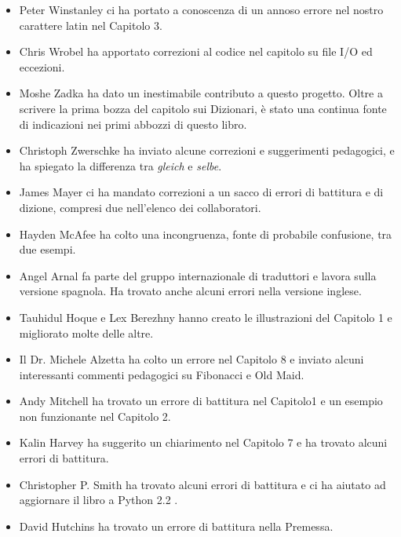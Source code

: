 \documentclass[10pt]{book}
\begin{document}
\begin{itemize}
\item Peter Winstanley ci ha portato a conoscenza di un annoso errore nel nostro carattere latin nel Capitolo 3.

\item Chris Wrobel ha apportato correzioni al codice nel capitolo su file I/O ed eccezioni. 

\item Moshe Zadka ha dato un inestimabile contributo a questo progetto. Oltre a scrivere la prima bozza del capitolo sui Dizionari, è stato una continua fonte di indicazioni nei primi abbozzi di questo libro.

\item Christoph Zwerschke ha inviato alcune correzioni e suggerimenti pedagogici, e ha spiegato la differenza tra {\em gleich} e {\em selbe}.

\item James Mayer ci ha mandato correzioni a un sacco di errori di battitura e di dizione, compresi due nell'elenco dei collaboratori.

\item Hayden McAfee ha colto una incongruenza, fonte di probabile confusione, tra due esempi.

\item Angel Arnal fa parte del gruppo internazionale di traduttori e lavora sulla versione spagnola. Ha trovato anche alcuni errori nella versione inglese.

\item Tauhidul Hoque e Lex Berezhny hanno creato le illustrazioni del Capitolo 1 e migliorato molte delle altre.

\item Il Dr. Michele Alzetta ha colto un errore nel Capitolo 8 e inviato alcuni interessanti commenti pedagogici su Fibonacci e Old Maid.

\item Andy Mitchell ha trovato un errore di battitura nel Capitolo1 e un esempio non funzionante nel Capitolo 2.

\item Kalin Harvey ha suggerito un chiarimento nel Capitolo 7 e ha trovato alcuni errori di battitura.

\item Christopher P. Smith ha trovato alcuni errori di battitura e ci ha aiutato ad aggiornare il libro a Python 2.2 .

\item David Hutchins ha trovato un errore di battitura nella Premessa.


\end{itemize}
\end{document}
